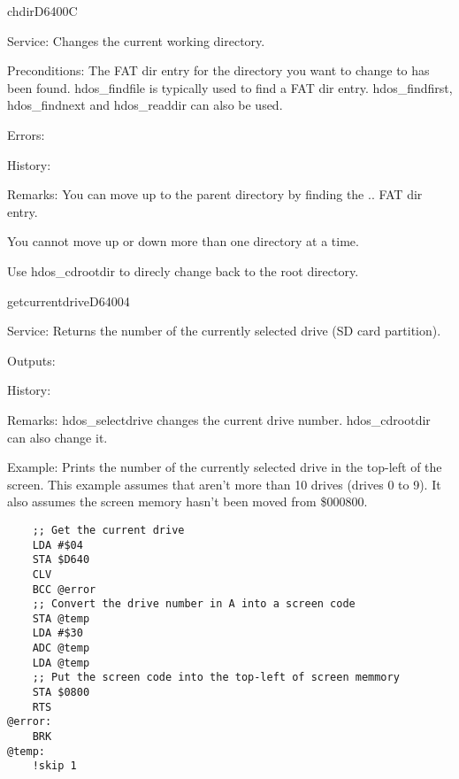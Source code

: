 \begin{hyppotrap}{chdir}{D640}{0C}
\item [Service:]
  Changes the current working directory.
\item [Preconditions:]
  The FAT dir entry for the directory you want to change to has been
  found. hdos\_findfile is typically used to find a FAT dir entry.
  hdos\_findfirst, hdos\_findnext and hdos\_readdir can also be used.
\item [Errors:]
\item [History:]
\item [Remarks:]
  You can move up to the parent directory by finding the .. FAT dir entry.

  You cannot move up or down more than one directory at a time.

  Use hdos\_cdrootdir to direcly change back to the root directory.
\end{hyppotrap}


\newpage
\begin{hyppotrap}{getcurrentdrive}{D640}{04}
\item [Service:]
  Returns the number of the currently selected drive (SD card partition).
\item [Outputs:]
\item [History:]
\item [Remarks:]
  hdos\_selectdrive changes the current drive number. hdos\_cdrootdir
  can also change it.
\item [Example:]
  Prints the number of the currently selected drive in the top-left of the
  screen. This example assumes that aren't more than 10 drives (drives 0 to 9).
  It also assumes the screen memory hasn't been moved from \$000800.
\begin{tcolorbox}[colback=black,coltext=white]
\verbatimfont{\codefont}
\begin{verbatim}
    ;; Get the current drive
    LDA #$04
    STA $D640
    CLV
    BCC @error
    ;; Convert the drive number in A into a screen code
    STA @temp
    LDA #$30
    ADC @temp
    LDA @temp
    ;; Put the screen code into the top-left of screen memmory
    STA $0800
    RTS
@error:
    BRK
@temp:
    !skip 1
\end{verbatim}
\end{tcolorbox}
\end{hyppotrap}


